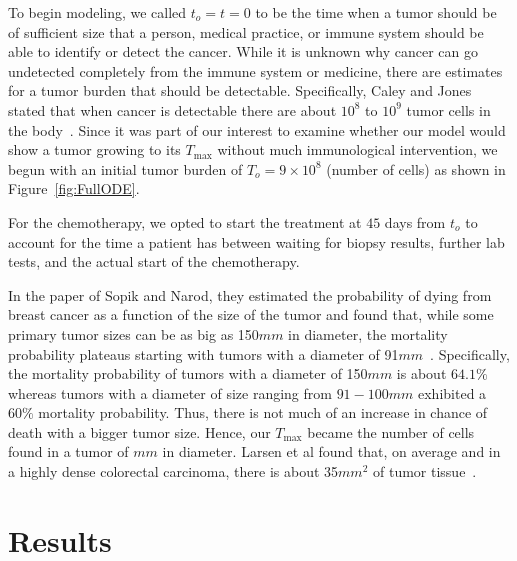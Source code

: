 \documentclass[11pt]{amsart}
\begin{document}
To begin modeling, we called $t_o=t=0$ to be the time when a tumor should be of sufficient size that a person, medical practice, or immune system should be able to identify or detect the cancer.
While it is unknown why cancer can go undetected completely from the immune system or medicine, there are estimates for a tumor burden that should be detectable. 
Specifically, Caley and Jones stated that when cancer is detectable there are about $10^8$ to $10^9$ tumor cells in the body\ \cite{CALEY2012186}. 
Since it was part of our interest to examine whether our model would show a tumor growing to its $T_{\max}$ without much immunological intervention, we begun with an initial tumor burden of $T_o = 9\times10^8$ (number of cells) as shown in  Figure~\ref{fig:FullODE}.

For the chemotherapy, we opted to start the treatment at $45$ days from $t_o$ to account for the time a patient has between waiting for biopsy results, further lab tests, and the actual start of the chemotherapy.

In the paper of Sopik and Narod, they estimated the probability of dying from breast cancer as a function of the size of the tumor and found that, while some primary tumor sizes can be as big as 150$mm$ in diameter, the mortality probability plateaus starting with tumors with a diameter of  91$mm$\ \cite{SopikTumorSize}.
Specifically, the mortality probability of tumors with a  diameter of 150$mm$ is about $64.1\%$ whereas tumors with a diameter of size ranging from $91-100 mm$ exhibited a $60\%$ mortality probability.
Thus, there is not much of an increase in chance of death with a bigger tumor size.
Hence, our $T_{\max}$ became the number of cells found in a tumor of $mm$ in diameter.
Larsen et al found that, on average and in a highly dense colorectal carcinoma, there is about 35$mm^2$  of tumor tissue\ \cite{LarsenStineNkCellsRatio}.

\section{Results}



\end{document}
